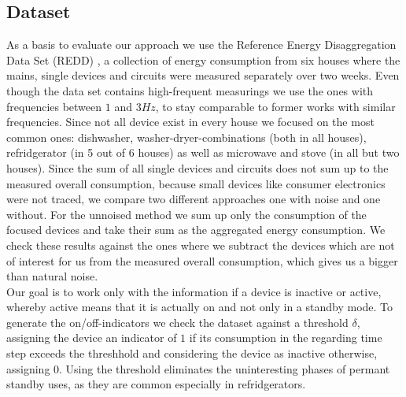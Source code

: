 \documentclass{article}
\begin{document}
\subsection{Dataset}
As a basis to evaluate our approach we use the Reference Energy Disaggregation Data Set (REDD) \cite{Redd}, a collection of energy consumption 
from six houses where the mains, single devices and circuits were measured separately over two weeks. Even though the data set contains high-frequent 
measurings we use the ones with frequencies between $1$ and $3 Hz$, to stay comparable to former works with similar frequencies. Since not all 
device exist in every house we focused on the most common ones: dishwasher, washer-dryer-combinations (both in all houses), refridgerator (in 5 
out of 6 houses) as well as microwave and stove (in all but two houses). Since the sum of all single devices and circuits does not sum up to the 
measured overall consumption, because small devices like consumer electronics were not traced, we compare two different approaches one with noise 
and one without. For the unnoised method we sum up only the consumption of the focused devices and take their sum as the aggregated energy consumption. 
We check these results against the ones where we subtract the devices which are not of interest for us from the measured overall consumption, which 
gives us a bigger than natural noise.\\
Our goal is to work only with the information if a device is inactive or active, whereby active means that it is actually on and not only in a
standby mode. To generate the  on/off-indicators we check the dataset against a threshold $\delta$, assigning the device an indicator of $1$ if its 
consumption in the regarding time step exceeds the threshhold and considering the device as inactive otherwise, assigning $0$. Using the threshold 
eliminates the uninteresting phases of permant standby uses, as they are common especially in refridgerators.
\end{document}

